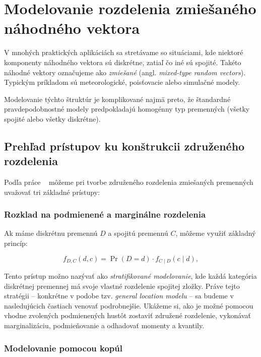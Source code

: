\section{Modelovanie rozdelenia zmiešaného náhodného vektora}\label{sec:joint_mixture_modeling}

V mnohých praktických aplikáciách sa stretávame so situáciami, kde niektoré komponenty náhodného vektora sú diskrétne, zatiaľ čo iné sú spojité. Takéto náhodné vektory označujeme ako \textit{zmiešané} (angl. \textit{mixed-type random vectors}). Typickým príkladom sú meteorologické, poisťovacie alebo simulačné modely. 

Modelovanie týchto štruktúr je komplikované najmä preto, že štandardné pravdepodobnostné modely predpokladajú homogénny typ premenných (všetky spojité alebo všetky diskrétne).

\subsection{Prehľad prístupov ku konštrukcii združeného rozdelenia}\label{subsec:overview_joint_mixed}

Podľa práce ~\textcite{pleisMixtureDissertation} môžeme pri tvorbe združeného rozdelenia zmiešaných premenných uvažovať tri základné prístupy:

\subsubsection{Rozklad na podmienené a marginálne rozdelenia}

Ak máme diskrétnu premennú $D$ a spojitú premennú $C$, môžeme využiť základný princíp:

\begin{equation}
f_{D,C}(d, c) = \Pr(D = d) \cdot f_{C \mid D}(c \mid d),
\end{equation}

Tento prístup možno nazývať ako \textit{stratifikované modelovanie}, kde každá kategória diskrétnej premennej má svoje vlastné rozdelenie spojitej zložky. Práve tejto stratégii – konkrétne v podobe tzv. \textit{general location modelu} – sa budeme v nasledujúcich častiach venovať podrobnejšie. Ukážeme si, ako je možné pomocou vhodne zvolených podmienených hustôt zostaviť združené rozdelenie, vykonávať marginalizáciu, podmieňovanie a odhadovať momenty a kvantily.

\subsubsection{Modelovanie pomocou kopúl}\label{copula_joint_density}

